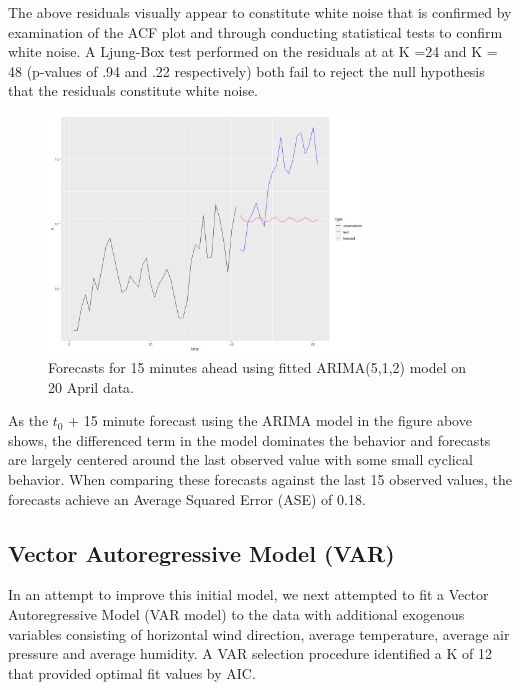 \documentclass{llncs}
\begin{document}
The above residuals visually appear to constitute white noise that is confirmed by examination of the ACF plot and through conducting statistical tests to confirm white noise. A Ljung-Box test performed on the residuals at at K =24 and K = 48 (p-values of .94 and .22 respectively) both fail to reject the null hypothesis that the residuals constitute white noise.

\begin{figure}
  \centering
  \includegraphics[width=0.75\textwidth]{apr_20_arima_forecasts.png}
  \caption{Forecasts for 15 minutes ahead using fitted ARIMA(5,1,2) model on 20 April data.}
  \label{fig:apr20arimaforecast}
\end{figure}

As the $t_0$ + 15 minute forecast using the ARIMA model in the figure above shows, the differenced term in the model dominates the behavior and forecasts are largely centered around the last observed value with some small cyclical behavior. When comparing these forecasts against the last 15 observed values, the forecasts achieve an Average Squared Error (ASE) of 0.18.

\subsection{Vector Autoregressive Model (VAR)}

In an attempt to improve this initial model, we next attempted to fit a Vector Autoregressive Model (VAR model) to the data with additional exogenous variables consisting of horizontal wind direction, average temperature, average air pressure and average humidity. A VAR selection procedure identified a K of 12 that provided optimal fit values by AIC.
\end{document}
